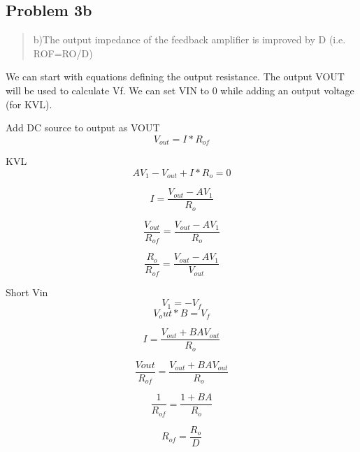 \documentclass[10pt,a4paper]{article}
\let\oldsubsection\subsection
\renewcommand{\subsection}{%
    \setcounter{equation}{0}%
    \oldsubsection%
}
\begin{document}
\subsection{Problem 3b}
\begin{quote}
b)The output impedance of the feedback amplifier is improved by D (i.e. ROF=RO/D)\\
\end{quote}
\begin{multicols}{2}

We can start with equations defining the output resistance. The output VOUT will be used to calculate Vf. We can set VIN to 0 while adding an output voltage (for KVL).

Add DC source to output as VOUT
\begin{equation}
V_{out} = I * R_{of} 
\end{equation}

KVL
\begin{equation}
AV_1 - V_{out} + I*R_o =0
\end{equation}

\begin{equation}
I = \frac{V_{out}- AV_1}{R_o}
\end{equation}

\begin{equation}
\frac{V_{out}}{R_{of}} = \frac{V_{out}- AV_1}{R_o}
\end{equation}

\begin{equation}
\frac{R_o}{R_{of}} = \frac{V_{out}- AV_1}{V_{out}}
\end{equation}

Short Vin
\begin{equation}
V_1 = -V_f
\end{equation}
\begin{equation}
V_out * B = V_f
\end{equation}

\begin{equation}
I = \frac{V_{out}+ BA V_{out}}{R_o}
\end{equation}

\begin{equation}
\frac{V{out}}{R_{of}} = \frac{V_{out}+ BA V_{out}}{R_o}
\end{equation}

\begin{equation}
\frac{1}{R_{of}} = \frac{1+ BA }{R_o}
\end{equation}

\begin{equation}
R_{of} = \frac{R_o}{D}
\end{equation}


\end{multicols}
\end{document}
